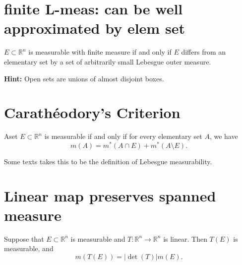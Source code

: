 \documentclass[lang=cn,11pt]{template}
\begin{document}
\section{finite L-meas: can be well approximated by elem set}
\begin{theorem}
$E \subset \mathbb{R}^n$ is measurable with finite measure if and only if $E$ differs from an elementary set by a set of arbitrarily small Lebesgue outer measure.
\end{theorem}
\textbf{Hint:} Open sets are unions of almost disjoint boxes.

\section{Carathéodory's Criterion}
\begin{theorem}
Aset $E \subset \mathbb{R}^n$ is measurable if and only if for every elementary set $A$, we have
\[
m(A) = m^*(A \cap E) + m^*(A \setminus E).
\]
\end{theorem}
\begin{remark}
Some texts takes this to be the definition of Lebesgue measurability.
\end{remark}




\section{Linear map preserves spanned measure}
\begin{theorem}
Suppose that $E \subset \mathbb{R}^n$ is measurable and $T : \mathbb{R}^n \to \mathbb{R}^n$ is linear. Then $T(E)$ is measurable, and
\[
m(T(E)) = |\det(T)| m(E).
\]
\end{theorem}




\end{document}
